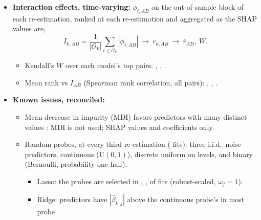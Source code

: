 \begin{itemize}
\begin{itemize}
\[    \]
  \item Top pair, $H^2$ (\%): \rhfiLgbmHTop, \rhfiXgbHTop, \rhfiRfHTop; over the top \rhfiHTopSeries:
    \rhfiLgbmHMin--\rhfiLgbmHMax, \rhfiXgbHMin--\rhfiXgbHMax, \rhfiRfHMin--\rhfiRfHMax.
  \item Top pair, $H^2_{\min}$: \rhfiLgbmHMinTop, \rhfiXgbHMinTop, \rhfiRfHMinTop; over the top
    \rhfiHTopSeries: \rhfiLgbmHMinLo--\rhfiLgbmHMinHi, \rhfiXgbHMinLo--\rhfiXgbHMinHi, \rhfiRfHMinLo--\rhfiRfHMinHi.
  \item Top predictor pair, $H^2$ (\%) and $H^2_{\min}$: LightGBM \rhfiLgbmHColTop, \rhfiLgbmHMinColTop; XGBoost
    \rhfiXgbHColTop, \rhfiXgbHMinColTop; random forest \rhfiRfHColTop, \rhfiRfHMinColTop.
  \end{itemize}
\item \textbf{Interaction effects, time-varying:} $\phi_{t,AB}$ on the out-of-sample block of each re-estimation,
  ranked at each re-estimation and aggregated as the SHAP values are,
  \[
    I_{k,AB} = \frac{1}{|\mathcal O_k|} \sum_{t \in \mathcal O_k} |\phi_{t,AB}| \ \to\ r_{k,AB} \ \to\ \bar r_{AB},\ W .
  \]
  \begin{itemize}
  \item Kendall's $W$ over each model's top \rhfiTopWPairs{} pairs: \rhfiLgbmInterW, \rhfiXgbInterW, \rhfiRfInterW.
  \item Mean rank vs $\bar I_{AB}$ (Spearman rank correlation, all pairs): \rhfiLgbmInterSpGlobal,
    \rhfiXgbInterSpGlobal, \rhfiRfInterSpGlobal.
  \end{itemize}
\item \textbf{Known issues, reconciled:}
  \begin{itemize}
  \item Mean decrease in impurity (MDI) favors predictors with many distinct values
    \citep{StroblBoulesteixZeileisHothorn2007}: MDI is not used; SHAP values and coefficients only.
  \item Random probes, at every third re-estimation (\rhfiNProbe{} fits): three i.i.d.\ noise predictors, continuous
    ($\mathrm{U}(0,1)$), discrete uniform on \rhfiProbeLevels{} levels, and binary (Bernoulli, probability one half).
    \begin{itemize}
    \item Lasso: the probes are selected in \rhfiLassoProbeSel, \rhfiLassoProbeSelLevels, \rhfiLassoProbeSelBinary{}
      of \rhfiNProbe{} fits (robust-scaled, $\omega_j = 1$).
    \item Ridge: \rhfiRidgeProbeBeat{} predictors have $|\hat\beta_{k,j}|$ above the continuous probe's in most probe

\end{itemize}
\end{itemize}
\end{itemize}
